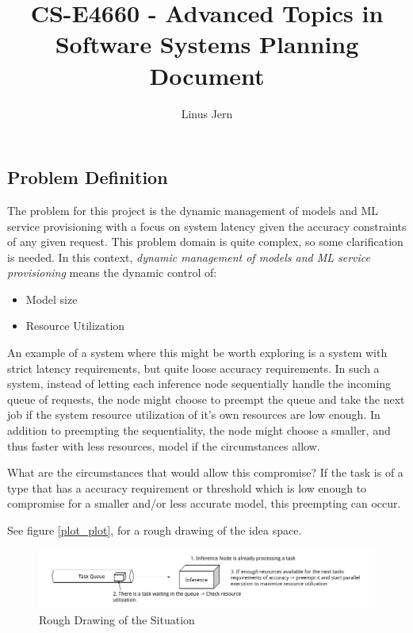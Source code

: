 \documentclass[12pt, a4paper]{article}
\title{
CS-E4660 - Advanced Topics in Software Systems
\large{Planning Document}
}
\author{Linus Jern}
\theoremstyle{plain}
\theoremstyle{definition}
\begin{document}
\maketitle

\subsection*{Problem Definition}

The problem for this project is the dynamic management of models and ML service provisioning with a focus on system latency given the accuracy constraints of any given request. 
This problem domain is quite complex, so some clarification is needed.
In this context, \textit{dynamic management of models and ML service provisioning} means the dynamic control of:
\begin{itemize}
    \item Model size
    \item Resource Utilization
\end{itemize}

An example of a system where this might be worth exploring is a system with strict latency requirements, but quite loose accuracy requirements.
In such a system, instead of letting each inference node sequentially handle the incoming queue of requests, the node might choose to preempt the queue and take the next job if the system resource utilization of it's own resources are low enough.
In addition to preempting the sequentiality, the node might choose a smaller, and thus faster with less resources, model if the circumstances allow.

What are the circumstances that would allow this compromise?
If the task is of a type that has a accuracy requirement or threshold which is low enough to compromise for a smaller and/or less accurate model, this preempting can occur.

See figure \autoref{plot_plot}, for a rough drawing of the idea space.
\begin{figure}[H]
    \centering
    \includegraphics[width=\textwidth]{atss.png}
    \caption{Rough Drawing of the Situation}
    \label{plot_plot}
\end{figure}








    
\end{document}

